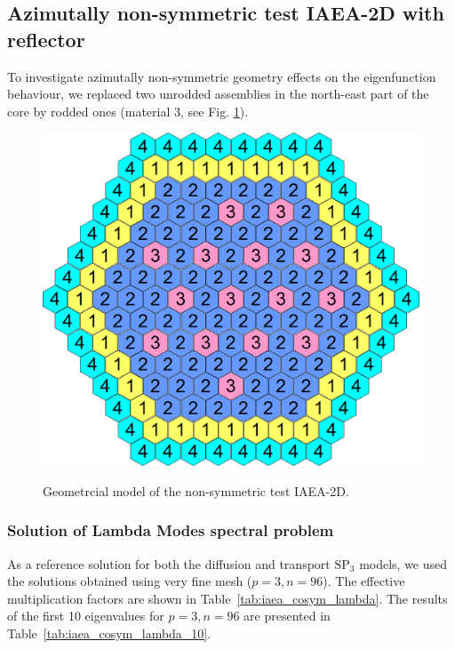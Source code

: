 \documentclass[authoryear]{elsarticle}
\begin{document}
\subsection{Azimutally non-symmetric test IAEA-2D with reflector}

To investigate azimutally non-symmetric geometry effects on the eigenfunction behaviour, we replaced two unrodded assemblies in the north-east part of the core by rodded ones (material 3, see Fig. \ref{fig:iaea_cosym}). 

\begin{figure}[h]
	\begin{center}
		\includegraphics[width=0.75\linewidth]{iaea_cosym.png}\\
		\caption{Geometrcial model of the non-symmetric test IAEA-2D.}
		\label{fig:iaea_cosym}
	\end{center}
\end{figure}

\subsubsection{Solution of Lambda Modes spectral problem}
As a reference solution for both the diffusion and transport $\mathrm{SP_3}$ models, we used the solutions obtained using very fine mesh ($p = 3, n = 96$). 
The effective multiplication factors are shown in Table~\ref{tab:iaea_cosym_lambda}. 
The results of the first 10 eigenvalues for $ p = 3, n = 96 $ are presented in Table~\ref{tab:iaea_cosym_lambda_10}.
\end{document}
